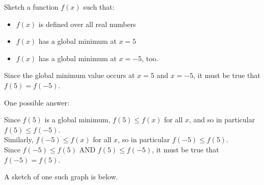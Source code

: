 \begin{question}
Sketch a function $f(x)$ such that:
\begin{itemize}
\item $f(x)$ is defined over all real numbers
\item $f(x)$ has a global minimum at $x=5$
\item $f(x)$ has a global minimum at $x=-5$, too.
\end{itemize}
\end{question}
\begin{hint}
Since the global minimum value occurs at $x=5$ and $x=-5$, it must be true that $f(5)=f(-5)$.
\end{hint}
\begin{answer}
One possible answer:
\begin{center}
\end{center}
\end{answer}
\begin{solution}
Since $f(5)$ is a global minimum, $f(5) \leq f(x)$ for all $x$, and so in particular $f(5) \leq f(-5)$.\\
Similarly, $f(-5) \leq f(x)$ for all $x$, so in particular $f(-5) \leq f(5)$. \\
Since $f(-5) \leq f(5)$ AND $f(5) \leq f(-5)$, it must be true that $f(-5)=f(5)$.

A sketch of one such graph is below.
\begin{center}
\end{center}

\end{solution}


\subsection*{\Procedural}


